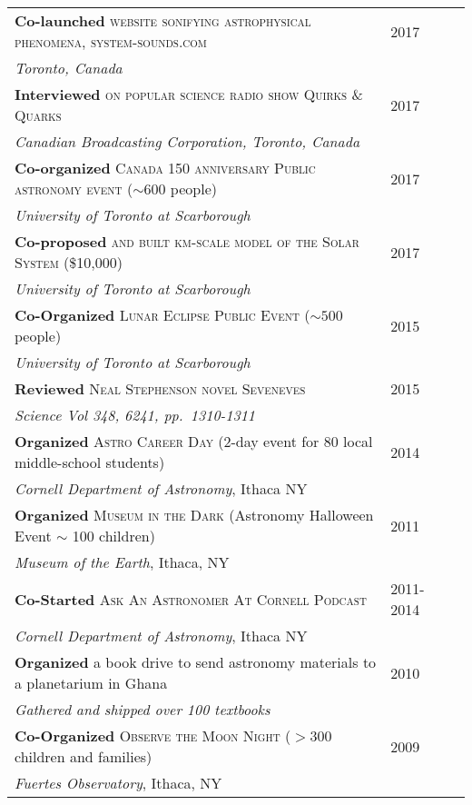 \documentclass[10pt]{article} %
\begin{document}
{\begin{tabular}{l>{\hfill}p{2.2cm}r}
{\bf Co-launched} \textsc{website sonifying astrophysical phenomena, system-sounds.com} & 2017 \\
{\it Toronto, Canada} \\
{\bf Interviewed} \textsc{on popular science radio show Quirks \& Quarks} & 2017 \\
{\it Canadian Broadcasting Corporation, Toronto, Canada} \\
{\bf Co-organized} \textsc{Canada 150 anniversary Public astronomy event} ($\sim 600$ people) & 2017 \\
{\it University of Toronto at Scarborough} \\
{\bf Co-proposed} \textsc{and built km-scale model of the Solar System} \footnotesize(\$10,000)\normalsize & 2017 \\
{\it University of Toronto at Scarborough} \\
{\bf Co-Organized} \textsc{Lunar Eclipse Public Event} ($\sim 500$ people) & 2015\\
{\it University of Toronto at Scarborough} \\
{\bf Reviewed} \textsc{Neal Stephenson novel Seveneves} & 2015\\
{\it Science Vol 348, 6241, pp.~1310-1311} \\
{\bf Organized} \textsc{Astro Career Day} (2-day event for 80 local middle-school students) & 2014\\
{\it Cornell Department of Astronomy}, Ithaca NY \\
{\bf Organized} \textsc{Museum in the Dark} (Astronomy Halloween Event $\sim$ 100 children) & 2011\\
{\it Museum of the Earth}, Ithaca, NY \\
{\bf Co-Started} \textsc{Ask An Astronomer At Cornell Podcast} & 2011-2014\\
{\it Cornell Department of Astronomy}, Ithaca NY  \\
{\bf Organized} a book drive to send astronomy materials to a planetarium in Ghana & 2010\\
{\it Gathered and shipped over 100 textbooks} \\
{\bf Co-Organized} \textsc{Observe the Moon Night} ($> 300$ children and families) & 2009\\
{\it Fuertes Observatory}, Ithaca, NY \\
\end{tabular}



}
\end{document}
